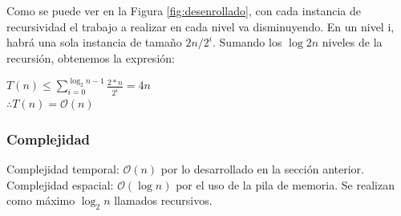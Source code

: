 Como se puede ver en la Figura \ref{fig:desenrollado}, con cada instancia de recursividad el trabajo a realizar en cada nivel va disminuyendo. En un nivel i, habrá una sola instancia de tamaño $2n/2^i$. Sumando los $\log{2}{n}$ niveles de la recursión, obtenemos la expresión:
\begin{center}

    \doublespacing$T(n) \leq \sum^{\log_{2}{n}-1}_{i=0} \frac{2*n}{2^i} = 4n$\\
    $\therefore T(n) = \mathcal{O}(n)$
\end{center}
\subsubsection{Complejidad}
Complejidad temporal: $\mathcal{O}(n)$ por lo desarrollado en la sección anterior.\\
Complejidad espacial: $\mathcal{O}(\log{n})$ por el uso de la pila de memoria. Se realizan como máximo $\log_{2}{n}$ llamados recursivos. 
